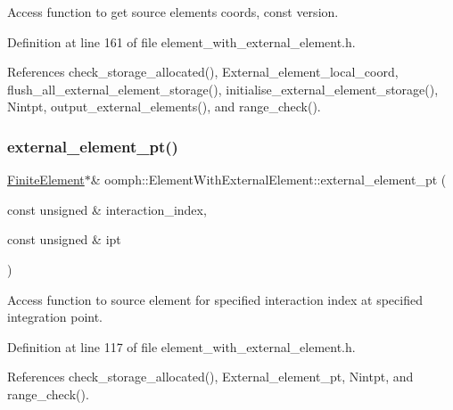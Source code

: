 Access function to get source element\textquotesingle{}s coords, const version. 



Definition at line 161 of file element\+\_\+with\+\_\+external\+\_\+element.\+h.



References check\+\_\+storage\+\_\+allocated(), External\+\_\+element\+\_\+local\+\_\+coord, flush\+\_\+all\+\_\+external\+\_\+element\+\_\+storage(), initialise\+\_\+external\+\_\+element\+\_\+storage(), Nintpt, output\+\_\+external\+\_\+elements(), and range\+\_\+check().

\mbox{\label{classoomph_1_1ElementWithExternalElement_a30c8347cfed1bb9d4ebc500f705bc739}} 
\subsubsection{\texorpdfstring{external\+\_\+element\+\_\+pt()}{external\_element\_pt()}\hspace{0.1cm}{\footnotesize\ttfamily [1/2]}}
{\footnotesize\ttfamily \hyperlink{classoomph_1_1FiniteElement}{Finite\+Element}$\ast$\& oomph\+::\+Element\+With\+External\+Element\+::external\+\_\+element\+\_\+pt (\begin{DoxyParamCaption}\item[{const unsigned \&}]{interaction\+\_\+index,  }\item[{const unsigned \&}]{ipt }\end{DoxyParamCaption})\hspace{0.3cm}{\ttfamily [inline]}}



Access function to source element for specified interaction index at specified integration point. 



Definition at line 117 of file element\+\_\+with\+\_\+external\+\_\+element.\+h.



References check\+\_\+storage\+\_\+allocated(), External\+\_\+element\+\_\+pt, Nintpt, and range\+\_\+check().



